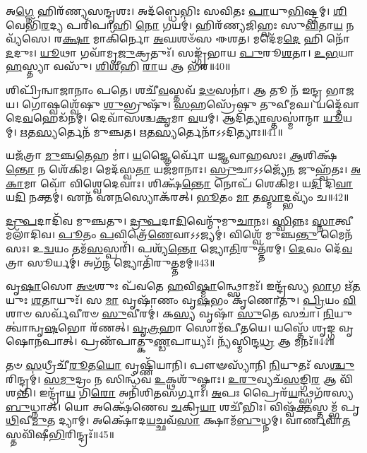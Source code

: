 𑌅\-\ul{𑌗𑍍𑌨𑍇} 𑌹𑌿𑌰᳴𑌣𑍍𑌯𑌸𑌨𑍍𑌦𑍃𑌶𑌃।
𑌅𑌦᳴𑌬𑍍𑌧𑍇𑌭𑌿𑌃 𑌸𑌵𑌿𑌤𑌃 \ul{𑌪𑌾}\-𑌯𑍁\-\ul{𑌭𑌿}\-𑌷𑍍𑌟𑍍𑌵𑌮𑍍।
\-\ul{𑌶𑌿}\-𑌵𑍇𑌭𑌿᳴\-\ul{𑌰}\-𑌦𑍍𑌯 𑌪𑌰𑌿᳴𑌪𑌾𑌹𑌿 \ul{𑌨𑍋} 𑌗𑌯𑌮𑍍॑।
𑌹𑌿𑌰᳴𑌣𑍍𑌯𑌜𑌿𑌹𑍍𑌵𑌃 𑌸𑍁\-\ul{𑌵𑌿}\-𑌤𑌾\-\ul{𑌯} 𑌨𑌵𑍍𑌯᳴𑌸𑍇।
𑌰\-\ul{𑌕𑍍𑌷𑌾} 𑌮𑌾𑌕𑌿᳴𑌰𑍍𑌨𑍋 \ul{𑌅}\-𑌘𑌶𑍞᳴𑌸 𑌈𑌶𑌤।
𑌮𑌦𑍇᳴𑌮\-\ul{𑌦𑍇} 𑌹𑌿 𑌨𑍋᳴ \ul{𑌦}\-𑌦𑍁𑌃।
\-\ul{𑌯𑍂}\-𑌥𑌾 𑌗𑌵𑌾᳴𑌮𑍃\-\ul{𑌜𑍁}\-𑌕𑍍𑌰𑌤𑍁𑌃᳴।
𑌸𑌙𑍍𑌗𑍃᳴𑌭𑌾𑌯 \ul{𑌪𑍁}\-𑌰𑍂\-\ul{𑌶}\-𑌤𑌾।
\-\ul{𑌉}\-\-\ul{𑌭}\-𑌯𑌾 \ul{𑌹}\-𑌸𑍍𑌤𑍍𑌯𑌾 𑌵𑌸𑍁᳴।
\-\ul{𑌶𑌿}\-\-\ul{𑌶𑍀}\-𑌹𑌿 \ul{𑌰𑌾}\-𑌯 𑌆 𑌭᳴𑌰॥40॥

𑌶𑌿𑌪𑍍𑌰𑌿᳴𑌨𑍍𑌵𑌾𑌜𑌾𑌨𑌾𑌂 𑌪𑌤𑍇।
𑌶𑌚𑍀᳴\-\ul{𑌵}\-𑌸𑍍𑌤𑌵᳴ \ul{𑌦}\-\-\ul{𑍞}\-𑌸𑌨𑌾॑।
𑌆 𑌤𑍂 𑌨᳴ 𑌇𑌨𑍍𑌦𑍍𑌰 𑌭𑌾𑌜𑌯।
𑌗𑍋𑌷𑍍𑌵𑌶𑍍𑌵𑍇᳴𑌷𑍁 \ul{𑌶𑍁}\-𑌭𑍍𑌰𑍁𑌷𑍁᳴।
\-\ul{𑌸}\-𑌹𑌸𑍍𑌰𑍇᳴𑌷𑍁 𑌤𑍁𑌵𑍀𑌮𑌘।
𑌯𑌦𑍍𑌦𑍇᳴𑌵𑌾 𑌦𑍇\-\ul{𑌵}\-𑌹𑍇𑌡᳴𑌨𑌮𑍍।
𑌦𑍇𑌵𑌾᳴𑌸𑌶𑍍𑌚\-\ul{𑌕𑍃}\-𑌮𑌾 \ul{𑌵}\-𑌯𑌮𑍍।
𑌆𑌦𑌿᳴\-\ul{𑌤𑍍𑌯𑌾}\-𑌸𑍍𑌤𑌸𑍍𑌮𑌾॑𑌨𑍍𑌮𑌾 \ul{𑌯𑍂}\-𑌯𑌮𑍍।
\-\ul{𑌋}\-𑌤\-\ul{𑌸𑍍𑌯}\-𑌰𑍍𑌤𑍇𑌨᳴ 𑌮𑍁𑌞𑍍𑌚𑌤।
\-\ul{𑌋}\-𑌤\-\ul{𑌸𑍍𑌯}\-𑌰𑍍𑌤𑍇𑌨𑌾᳴𑌽𑌽𑌦𑌿𑌤𑍍𑌯𑌾𑌃॥41॥

𑌯𑌜᳴𑌤𑍍𑌰𑌾 \ul{𑌮𑍁}\-𑌞𑍍𑌚\-\ul{𑌤𑍇}\-𑌹 𑌮𑌾॑।
\-\ul{𑌯}\-𑌜𑍍𑌞𑍈𑌰𑍍𑌵𑍋᳴ 𑌯𑌜𑍍𑌞𑌵𑌾𑌹𑌸𑌃।
\-\ul{𑌆}\-𑌶𑌿𑌕𑍍𑌷᳴\-\ul{𑌨𑍍𑌤𑍋} 𑌨 𑌶𑍇᳴𑌕𑌿𑌮।
𑌮𑍇𑌦᳴𑌸𑍍𑌵\-\ul{𑌤𑌾} 𑌯𑌜᳴𑌮𑌾𑌨𑌾𑌃।
\-\ul{𑌸𑍍𑌰𑍁}\-𑌚𑌾\-𑌽𑌽𑌜𑍍𑌯𑍇᳴\-\ul{𑌨} 𑌜𑍁𑌹𑍍𑌵᳴𑌤𑌃।
\-\ul{𑌅}\-\-\ul{𑌕𑌾}\-𑌮𑌾 𑌵𑍋᳴ 𑌵𑌿𑌶𑍍𑌵𑍇𑌦𑍇𑌵𑌾𑌃।
𑌶𑌿𑌕𑍍𑌷᳴\-\ul{𑌨𑍍𑌤𑍋} 𑌨𑍋𑌪᳴ 𑌶𑍇𑌕𑌿𑌮।
𑌯\-\ul{𑌦𑌿} 𑌦𑌿\-\ul{𑌵𑌾} 𑌯\-\ul{𑌦𑌿} 𑌨𑌕𑍍𑌤𑌮𑍍॑।
𑌏𑌨᳴ 𑌏\-\ul{𑌨}\-𑌸𑍍𑌯𑍋𑌕᳴𑌰𑌤𑍍।
\-\ul{𑌭𑍂}\-𑌤𑌂 \ul{𑌮𑌾} 𑌤\-\ul{𑌸𑍍𑌮𑌾}\-𑌦𑍍𑌭𑌵𑍍𑌯𑌂᳴ 𑌚॥42॥

\-\ul{𑌦𑍍𑌰𑍁}\-\-\ul{𑌪}\-𑌦𑌾𑌦𑌿᳴𑌵 𑌮𑍁𑌞𑍍𑌚𑌤𑍁।
\-\ul{𑌦𑍍𑌰𑍁}\-\-\ul{𑌪}\-𑌦𑌾\-\ul{𑌦𑌿}\-𑌵𑍇𑌨𑍍𑌮𑍁᳴𑌮𑍁\-\ul{𑌚𑌾}\-𑌨𑌃।
\-\ul{𑌸𑍍𑌵𑌿}\-𑌨𑍍𑌨𑌃 \ul{𑌸𑍍𑌨𑌾}\-𑌤𑍍𑌵𑍀 𑌮𑌲𑌾᳴𑌦𑌿𑌵।
\-\ul{𑌪𑍂}\-𑌤𑌂 \ul{𑌪}\-𑌵𑌿𑌤𑍍𑌰𑍇᳴\-\ul{𑌣𑍇}\-𑌵𑌾𑌽𑌽𑌜𑍍𑌯𑌮𑍍॑।
𑌵𑌿𑌶𑍍𑌵𑍇᳴ 𑌮𑍁𑌞𑍍𑌚\-\ul{𑌨𑍍𑌤𑍁} 𑌮𑍈𑌨᳴𑌸𑌃।
𑌉\-\ul{𑌦𑍍𑌵}\-𑌯𑌂 𑌤𑌮᳴\-\ul{𑌸}\-𑌸𑍍𑌪𑌰𑌿᳴।
𑌪𑌶𑍍𑌯᳴\-\ul{𑌨𑍍𑌤𑍋} 𑌜𑍍𑌯𑍋\-\ul{𑌤𑌿}\-𑌰𑍁𑌤𑍍𑌤᳴𑌰𑌮𑍍।
\-\ul{𑌦𑍇}\-𑌵𑌂 𑌦𑍇᳴\-\ul{𑌵}\-𑌤𑍍𑌰𑌾 𑌸𑍂𑌰𑍍𑌯𑌮𑍍॑।
𑌅𑌗᳴\-\ul{𑌨𑍍𑌮} 𑌜𑍍𑌯𑍋𑌤𑌿᳴𑌰𑍁\-\ul{𑌤𑍍𑌤}\-𑌮𑌮𑍍॥43॥\anuvakamend[𑌤𑌵᳴ 𑌕𑍃\-\ul{𑌧𑌿} 𑌵\-\ul{𑌨}\-𑌸𑍍𑌪𑌤𑍀॑𑌞𑍍𑌜𑌾𑌨\-\ul{𑌤𑌾}\-𑌮𑌸᳴𑌤𑌿 \ul{𑌵}\-𑌯𑌂 𑌭᳴𑌰𑌾𑌦𑌿𑌤𑍍𑌯𑌾\-\ul{𑌶𑍍𑌚} 𑌨𑌵᳴ 𑌚]

𑌵𑍃\-\ul{𑌷𑌾}\-𑌸𑍋 \ul{𑌅}\-\-\ul{𑍞}\-𑌶𑍁𑌃 𑌪᳴𑌵𑌤𑍇 \ul{𑌹}\-𑌵𑌿\-\ul{𑌷𑍍𑌮𑌾}\-𑌨𑍍𑌥𑍍𑌸𑍋𑌮𑌃᳴।
𑌇𑌨𑍍𑌦𑍍𑌰᳴𑌸𑍍𑌯 \ul{𑌭𑌾}\-𑌗 𑌋᳴\-\ul{𑌤}\-𑌯𑍁𑌃 \ul{𑌶}\-𑌤𑌾𑌯𑍁𑌃᳴।
𑌸 \ul{𑌮𑌾} 𑌵𑍃𑌷𑌾᳴𑌣𑌂 𑌵𑍃\-\ul{𑌷}\-𑌭𑌂 𑌕𑍃᳴𑌣𑍋𑌤𑍁।
\-\ul{𑌪𑍍𑌰𑌿}\-𑌯𑌂 \ul{𑌵𑌿}\-𑌶𑌾𑍞 𑌸𑌰𑍍𑌵᳴𑌵𑍀𑌰𑍞 \ul{𑌸𑍁}\-𑌵𑍀𑌰𑌮𑍍॑।
𑌕\-\ul{𑌸𑍍𑌯} 𑌵𑍃𑌷𑌾᳴ \ul{𑌸𑍁}\-𑌤𑍇 𑌸𑌚𑌾॑।
\-\ul{𑌨𑌿}\-𑌯𑍁𑌤𑍍𑌵𑌾॑𑌨𑍍𑌵𑍃\-\ul{𑌷}\-𑌭𑍋 𑌰᳴𑌣𑌤𑍍।
\-\ul{𑌵𑍃}\-\-\ul{𑌤𑍍𑌰}\-𑌹𑌾 𑌸𑍋𑌮᳴𑌪𑍀𑌤𑌯𑍇।
𑌯𑌸𑍍𑌤𑍇᳴ 𑌶𑍃𑌙𑍍𑌗 𑌵𑍃𑌷𑍋𑌨𑌪𑌾𑌤𑍍।
𑌪𑍍𑌰𑌣᳴𑌪𑌾𑌤𑍍𑌕𑍁\-\ul{𑌣𑍍𑌡}\-𑌪𑌾𑌯𑍍𑌯𑌃᳴।
𑌨𑍍𑌯᳴𑌸𑍍𑌮𑌿𑌨𑍍𑌦\-\ul{𑌧𑍍𑌰} 𑌆 𑌮𑌨𑌃᳴॥44॥

𑌤𑍞 \ul{𑌸}\-𑌧𑍍𑌰𑍀𑌚𑍀᳴\-\ul{𑌰𑍂}\-𑌤\-\ul{𑌯𑍋} 𑌵𑍃𑌷𑍍𑌣𑌿᳴𑌯𑌾𑌨𑌿।
𑌪𑍗𑍟𑌸𑍍𑌯𑌾᳴𑌨𑌿 \ul{𑌨𑌿}\-𑌯𑍁𑌤𑌃᳴ 𑌸\-\ul{𑌶𑍍𑌚𑍁}\-\-𑌰𑌿𑌨𑍍𑌦𑍍𑌰𑌮𑍍॑।
\-\ul{𑌸}\-\-\ul{𑌮𑍁}\-𑌦𑍍𑌰𑌂 𑌨 𑌸𑌿𑌨𑍍𑌧᳴𑌵 \ul{𑌉}\-𑌕𑍍𑌥𑌶𑍁᳴𑌷𑍍𑌮𑌾𑌃।
\-\ul{𑌉}\-\-\ul{𑌰𑍁}\-𑌵𑍍𑌯𑌚᳴\-\ul{𑌸}\-𑌙𑍍𑌗𑌿\-\ul{𑌰} 𑌆 𑌵𑌿᳴𑌶𑌨𑍍𑌤𑌿।
𑌇𑌨𑍍𑌦𑍍𑌰𑌾᳴\-\ul{𑌯} 𑌗𑌿\-\ul{𑌰𑍋} 𑌅𑌨𑌿᳴𑌶𑌿𑌤𑌸𑌰𑍍𑌗𑌾𑌃।
\-\ul{𑌅}\-𑌪𑌃 𑌪𑍍𑌰𑍈𑌰᳴\-\ul{𑌯}\-𑌨𑍍𑌥𑍍𑌸𑌗᳴𑌰𑌸𑍍𑌯 \ul{𑌬𑍁}\-𑌧𑍍𑌨𑌾𑌤𑍍।
𑌯𑍋 𑌅𑌕𑍍𑌷𑍇᳴𑌣𑍇𑌵 \ul{𑌚}\-𑌕𑍍𑌰𑌿\-\ul{𑌯𑌾} 𑌶𑌚𑍀᳴𑌭𑌿𑌃।
𑌵𑌿𑌷𑍍𑌵᳴\-\ul{𑌕𑍍𑌤}\-𑌸𑍍𑌤𑌮𑍍𑌭᳴ 𑌪𑍃\-\ul{𑌥𑌿}\-𑌵𑍀\-\ul{𑌮𑍁}\-𑌤 𑌦𑍍𑌯𑌾𑌮𑍍।
𑌅𑌕𑍍𑌷𑍋᳴𑌦\-\ul{𑌯}\-𑌚𑍍𑌛𑌵᳴\-\ul{𑌸𑌾} 𑌕𑍍𑌷𑌾𑌮᳴\-\ul{𑌬𑍁}\-𑌧𑍍𑌨𑌮𑍍।
𑌵𑌾𑌰𑍍𑌣𑌵𑌾᳴\-\ul{𑌤}\-𑌸𑍍𑌤𑌵𑌿᳴𑌷𑍀\-\ul{𑌭𑌿}\-𑌰𑌿𑌨𑍍𑌦𑍍𑌰𑌃᳴॥45॥

